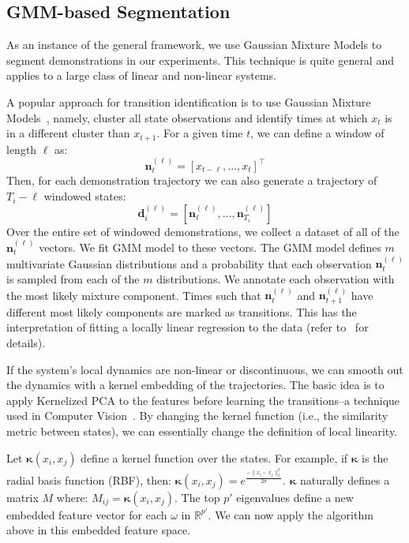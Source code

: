 \subsection{GMM-based Segmentation}\label{segm}
As an instance of the general framework, we use Gaussian Mixture Models to segment demonstrations in our experiments.
This technique is quite general and applies to a large class of linear and non-linear systems.

A popular approach for transition identification is to use Gaussian Mixture Models~\cite{calinon2014skills}, namely, cluster all state observations and identify times at which $x_t$ is in a different cluster than $x_{t+1}$.
For a given time $t$, we can define a window of length $\ell$ as:
\[
\mathbf{n}^{(\ell)}_t = [x_{t-\ell},...,x_{t}]^\intercal
\]
Then, for each demonstration trajectory we can also generate a trajectory of $T_i - \ell$ windowed states:
\[
\mathbf{d}^{(\ell)}_i = [\mathbf{n}^{(\ell)}_\ell,...,\mathbf{n}^{(\ell)}_{T_i}]
\]
Over the entire set of windowed demonstrations, we collect a dataset of all of the $\mathbf{n}^{(\ell)}_t$ vectors.
We fit GMM model to these vectors.
The GMM model defines $m$ multivariate Gaussian distributions and a probability that each observation $\mathbf{n}^{(\ell)}_t$ is sampled from each of the $m$ distributions.
We annotate each observation with the most likely mixture component.
Times such that $\mathbf{n}^{(\ell)}_t$ and $\mathbf{n}^{(\ell)}_{t+1}$ have different most likely components are marked as transitions.
This has the interpretation of fitting a locally linear regression to the data (refer to~\cite{moldovan2013dirichlet, khansari2011learning, kruger2010learning, krishnan2015tsc,murali2016} for details).

If the system's local dynamics are non-linear or discontinuous, we can smooth out the dynamics with a kernel embedding of the trajectories.
The basic idea is to apply Kernelized PCA to the features before learning the transitions--a technique used in Computer Vision~\cite{DBLP:conf/nips/MikaSSMSR98}.
By changing the kernel function (i.e., the similarity metric between states), we can essentially change the definition of local linearity.

Let $\mathbf{\kappa}(x_i,x_j)$ define a kernel function over the states.
For example, if $\mathbf{\kappa}$ is the radial basis function (RBF), then:
$ \mathbf{\kappa}(x_i,x_j) = e^{\frac{-\|x_i-x_j\|_2^2}{2\sigma}}$.
$\mathbf{\kappa}$ naturally defines a matrix $M$ where: $M_{ij} = \mathbf{\kappa}(x_i,x_j)$. 
The top $p'$ eigenvalues define a new embedded feature vector for each $\omega$ in $\mathbb{R}^{p'}$.
We can now apply the algorithm above in this embedded feature space.

